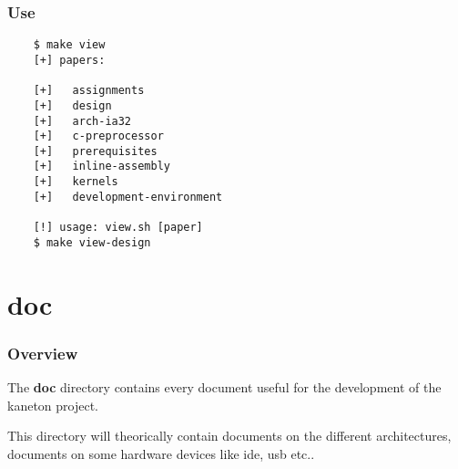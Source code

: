 \begin{frame}[containsverbatim]
  \frametitle{Use}

  \begin{verbatim}
    $ make view
    [+] papers:

    [+]   assignments
    [+]   design
    [+]   arch-ia32
    [+]   c-preprocessor
    [+]   prerequisites
    [+]   inline-assembly
    [+]   kernels
    [+]   development-environment

    [!] usage: view.sh [paper]
    $ make view-design
  \end{verbatim}
\end{frame}

%
%

\section{doc}


\begin{frame}
  \frametitle{Overview}

  The \textbf{doc} directory contains every document useful for
  the development of the kaneton project.

  \nl

  This directory will theorically contain documents on the different
  architectures, documents on some hardware devices like ide, usb etc..
\end{frame}


